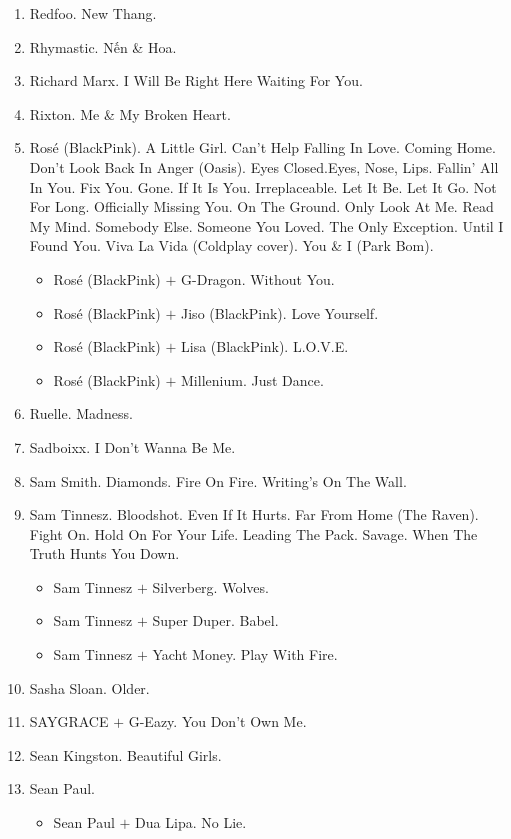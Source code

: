 \documentclass{article}
\begin{document}
\begin{enumerate}
	\item {\sc Redfoo.} New Thang.
	\item {\sc Rhymastic.} Nến \& Hoa.
	\item {\sc Richard Marx.} I Will Be Right Here Waiting For You.
	\item {\sc Rixton.} Me \& My Broken Heart.
	\item {\sc Ros\'e (BlackPink).} A Little Girl. Can't Help Falling In Love. Coming Home. Don't Look Back In Anger (Oasis). Eyes Closed.Eyes, Nose, Lips. Fallin' All In You. Fix You. Gone. If It Is You. Irreplaceable. Let It Be. Let It Go. Not For Long. Officially Missing You. On The Ground. Only Look At Me. Read My Mind. Somebody Else. Someone You Loved. The Only Exception. Until I Found You. Viva La Vida (Coldplay cover). You \& I (Park Bom).
	\begin{itemize}
		\item {\sc Ros\'e (BlackPink) $+$ G-Dragon.} Without You.
		\item {\sc Ros\'e (BlackPink) $+$ Jiso (BlackPink).} Love Yourself.
		\item {\sc Ros\'e (BlackPink) $+$ Lisa (BlackPink).} L.O.V.E.
		\item {\sc Ros\'e (BlackPink) $+$ Millenium.} Just Dance.
	\end{itemize}
	\item {\sc Ruelle.} Madness.
	\item {\sc Sadboixx.} I Don't Wanna Be Me.
	\item {\sc Sam Smith.} Diamonds. Fire On Fire. Writing's On The Wall.
	\item {\sc Sam Tinnesz.} Bloodshot. Even If It Hurts. Far From Home (The Raven). Fight On. Hold On For Your Life. Leading The Pack. Savage. When The Truth Hunts You Down.
	\begin{itemize}
		\item {\sc Sam Tinnesz $+$ Silverberg.} Wolves.
		\item {\sc Sam Tinnesz $+$ Super Duper.} Babel.
		\item {\sc Sam Tinnesz $+$ Yacht Money.} Play With Fire.
	\end{itemize}
	\item {\sc Sasha Sloan.} Older.
	\item {\sc SAYGRACE $+$ G-Eazy.} You Don't Own Me.
	\item {\sc Sean Kingston.} Beautiful Girls.
	\item {\sc Sean Paul.}
	\begin{itemize}
		\item {\sc Sean Paul $+$ Dua Lipa.} No Lie.

\end{itemize}
\end{enumerate}
\end{document}
